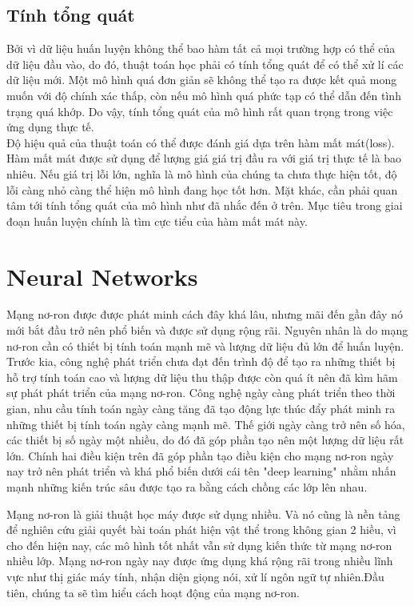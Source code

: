 \subsection{Tính tổng quát}

Bởi vì dữ liệu huấn luyện không thể bao hàm tất cả mọi trường hợp có thể của dữ liệu đầu vào, do đó, thuật toán học phải có tính tổng quát để có thể xử lí các dữ liệu mới. Một mô hình quá đơn giản sẽ không thể tạo ra được kết quả mong muốn với độ chính xác thấp, còn nếu mô hình quá phức tạp có thể dẫn đến tình trạng quá khớp. Do vậy, tính tổng quát của mô hình rất quan trọng trong việc ứng dụng thực tế.\\

Độ hiệu quả của thuật toán có thể được đánh giá dựa trên hàm mất mát(loss). Hàm mất mát được sử dụng để lượng giá giá trị đầu ra với giá trị thực tế là bao nhiêu. Nếu giá trị lỗi lớn, nghĩa là mô hình của chúng ta chưa thực hiện tốt, độ lỗi càng nhỏ càng thể hiện mô hình đang học tốt hơn. Mặt khác, cần phải quan tâm tới tính tổng quát của mô hình như đã nhắc đến ở trên. Mục tiêu trong giai đoạn huấn luyện chính là tìm cực tiểu của hàm mất mát này.

\section{Neural Networks}

Mạng nơ-ron được được phát minh cách đây khá lâu, nhưng mãi đến gần đây nó mới bắt đầu trở nên phổ biến và được sử dụng rộng rãi. Nguyên nhân là do mạng nơ-ron cần có thiết bị tính toán mạnh mẽ và lượng dữ liệu đủ lớn để huấn luyện. Trước kia, công nghệ phát triển chưa đạt đến trình độ để tạo ra những thiết bị hỗ trợ tính toán cao và lượng dữ liệu thu thập được còn quá ít nên đã kìm hãm sự phát phát triển của mạng nơ-ron. Công nghệ ngày càng phát triển theo thời gian, nhu cầu tính toán ngày càng tăng đã tạo động lực thúc đẩy phát minh ra những thiết bị tính toán ngày càng mạnh mẽ. Thế giới ngày càng trở nên số hóa, các thiết bị số ngày một nhiều, do đó đã góp phần tạo nên một lượng dữ liệu rất lớn. Chính hai điều kiện trên đã góp phần tạo điều kiện cho mạng nơ-ron ngày nay trở nên phát triển và khá phổ biến dưới cái tên "deep learning" nhằm nhấn mạnh những kiến trúc sâu được tạo ra bằng cách chồng các lớp lên nhau.

Mạng nơ-ron là giải thuật học máy được sử dụng nhiều. Và nó cũng là nền tảng để nghiên cứu giải quyết bài toán phát hiện vật thể trong không gian 2 hiều, vì cho đến hiện nay, các mô hình tốt nhất vẫn sử dụng kiến thức từ mạng nơ-ron nhiều lớp. Mạng nơ-ron ngày nay được ứng dụng khá rộng rãi trong nhiều lĩnh vực như thị giác máy tính, nhận diện giọng nói, xử lí ngôn ngữ tự nhiên.Đầu tiên, chúng ta sẽ tìm hiểu cách hoạt động của mạng nơ-ron.

